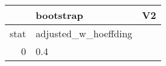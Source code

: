 \begin{table}[ht]
\centering
\begingroup\tiny
\begin{tabular}{rll}
  \hline
 & bootstrap & V2 \\ 
  \hline
stat & adjusted\_w\_hoeffding &  \\ 
  0 & 0.4 &  \\ 
   \hline
\end{tabular}
\endgroup
\end{table}
